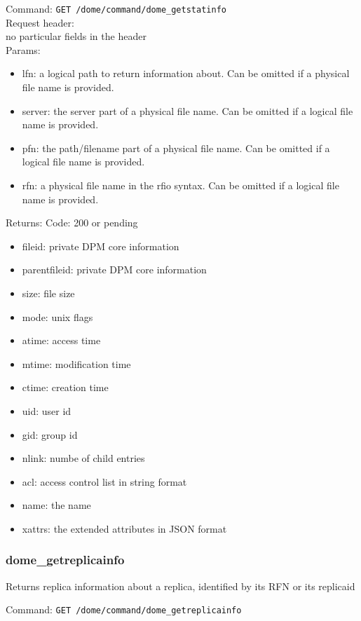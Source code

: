 \documentclass[a4paper,10pt]{scrreprt}
\begin{document}
Command:
\lstinline"GET /dome/command/dome_getstatinfo"\\

Request header:\\
no particular fields in the header\\

Params:
\begin{itemize}
 \item lfn: a logical path to return information about. Can be omitted if a physical file name is provided.
 \item server: the server part of a physical file name. Can be omitted if a logical file name is provided.
 \item pfn: the path/filename part of a physical file name. Can be omitted if a logical file name is provided.
 \item rfn: a physical file name in the rfio syntax. Can be omitted if a logical file name is provided.
\end{itemize}

Returns:
Code: 200 or pending
\begin{itemize}
 \item fileid: private DPM core information
 \item parentfileid: private DPM core information
 \item size: file size
 \item mode: unix flags
 \item atime: access time
 \item mtime: modification time
 \item ctime: creation time
 \item uid: user id
 \item gid: group id
 \item nlink: numbe of child entries
 \item acl: access control list in string format
 \item name: the name
 \item xattrs: the extended attributes in JSON format
\end{itemize}



\subsubsection{dome\_getreplicainfo}
Returns replica information about a replica, identified by its RFN or its replicaid

Command:
\lstinline"GET /dome/command/dome_getreplicainfo"\\
\end{document}
